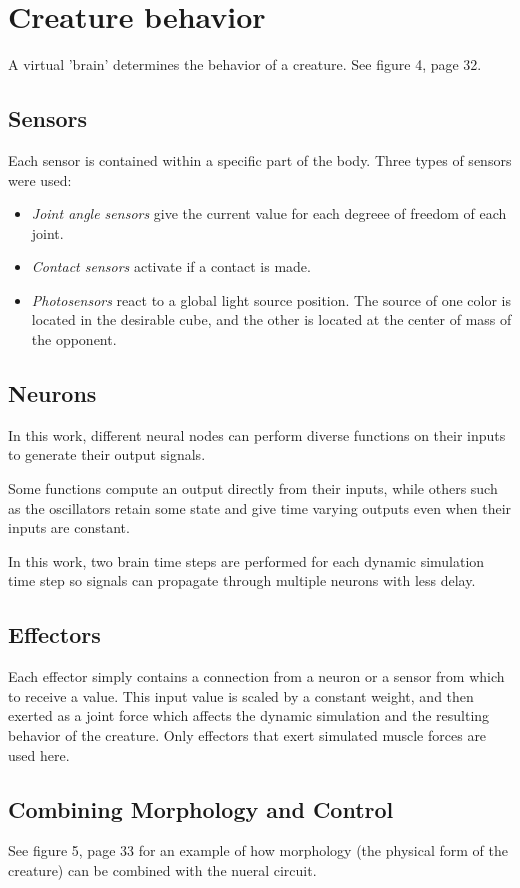 \documentclass[12pt]{book}
\begin{document}
\section{Creature behavior}
A virtual 'brain' determines the behavior of a creature. See figure 4, page 32.

\subsection{Sensors}
Each sensor is contained within a specific part of the body. Three types of sensors were used:
\begin{itemize}
\item \textit{Joint angle sensors} give the current value for each degreee of freedom of each joint.
\item \textit{Contact sensors} activate if a contact is made.
\item \textit{Photosensors} react to a global light source position. The source of one color is located in the desirable cube, and the other is located at the center of mass of the opponent.
\end{itemize}

\subsection{Neurons}
In this work, different neural nodes can perform diverse functions on their inputs to generate their output signals.

Some functions compute an output directly from their inputs, while others such as the oscillators retain some state and give time varying outputs even when their inputs are constant.

In this work, two brain time steps are performed for each dynamic simulation time step so signals can propagate through multiple neurons with less delay.

\subsection{Effectors}
Each effector simply contains a connection from a neuron or a sensor from which to receive a value. This input value is scaled by a constant weight, and then exerted as a joint force which affects the dynamic simulation and the resulting behavior of the creature. Only effectors that exert simulated muscle forces are used here.

\subsection{Combining Morphology and Control}
See figure 5, page 33 for an example of how morphology (the physical form of the creature) can be combined with the nueral circuit.
\end{document}
